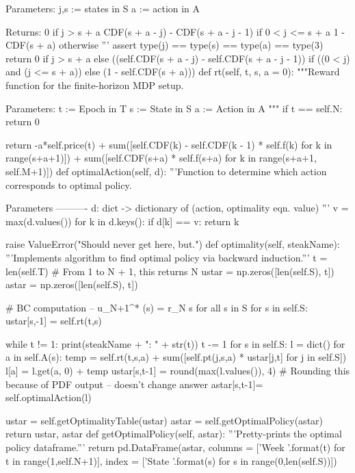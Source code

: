 \documentclass[12pt,a4paper]{article}
\begin{document}
\begin{python}
        Parameters:
        j,s := states in S
        a := action in A
        
        Returns:
        0 if j > s + a
        CDF(s + a - j) - CDF(s + a - j - 1) if 0 < j <= s + a
        1 - CDF(s + a) otherwise
        '''
        assert type(j) == type(s) == type(a) == type(3)
        return 0 if j > s + a else 
        ((self.CDF(s + a - j) - self.CDF(s + a - j - 1)) 
          if ((0 < j) and (j <= s + a)) 
          else (1 - self.CDF(s + a)))
    def rt(self, t, s, a = 0):
        """Reward function for the finite-horizon MDP setup.
        
        Parameters:
        t := Epoch in T
        s := State in S
        a := Action in A
        """
        if t == self.N:
            return 0
        
        return -a*self.price(t) + sum([self.CDF(k) - self.CDF(k - 1) * self.f(k) for k in range(s+a+1)]) + sum([self.CDF(s+a) * self.f(s+a) for k in range(s+a+1, self.M+1)])
    def optimalAction(self, d):
        '''Function to determine which action corresponds to optimal policy.
        
            Parameters
            ----------
            d: dict -> dictionary of (action, optimality eqn. value) 
        '''
        v = max(d.values())
        for k in d.keys():
            if d[k] == v:
                return k

        raise ValueError("Should never get here, but.")
    def optimality(self, steakName):
        '''Implements algorithm to find optimal policy via backward induction.'''
        t = len(self.T) # From 1 to N + 1, this returns N 
        ustar = np.zeros([len(self.S), t])
        astar = np.zeros([len(self.S), t])
        
        # BC computation -- u_{N+1}^{*} (s) = r_{N} s for all s in S
        for s in self.S:
            ustar[s,-1] = self.rt(t,s)
        
        while t != 1:
            print(steakName + ": " + str(t))
            t -= 1
            for s in self.S:
                l = dict()
                for a in self.A(s):
                    temp = self.rt(t,s,a) + sum([self.pt(j,s,a) * ustar[j,t] for j in self.S])
                    l[a] = l.get(a, 0) + temp
                ustar[s,t-1] = round(max(l.values()), 4) # Rounding this because of PDF output -- doesn't change answer
                astar[s,t-1]= self.optimalAction(l)
        
        ustar = self.getOptimalityTable(ustar)
        astar = self.getOptimalPolicy(astar)
        return ustar, astar
    def getOptimalPolicy(self, astar):
        '''Pretty-prints the optimal policy dataframe.'''
        return pd.DataFrame(astar, 
        columns = ['Week {}'.format(t) for t in 
                   range(1,self.N+1)], 
                   index   = ['State {}'.format(s) 
                   for s in range(0,len(self.S))])
    

\end{python}
\end{document}
